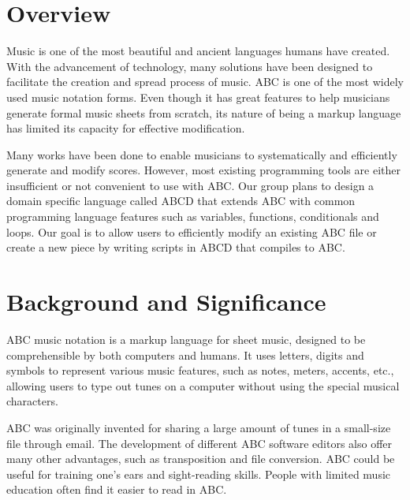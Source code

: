 \section{Overview}

Music is one of the most beautiful and ancient languages humans have created. With the advancement of technology, many solutions have been designed to facilitate the creation and spread process of music. ABC is one of the most widely used music notation forms. Even though it has great features to help musicians generate formal music sheets from scratch, its nature of being a markup language has limited its capacity for effective modification.

Many works have been done to enable musicians to systematically and efficiently generate and modify scores. However, most existing programming tools are either insufficient or not convenient to use with ABC. Our group plans to design a domain specific language called ABCD that extends ABC with common programming language features such as variables, functions, conditionals and loops. Our goal is to allow users to efficiently modify an existing ABC file or create a new piece by writing scripts in ABCD that compiles to ABC.

\section{Background and Significance}

ABC music notation is a markup language for sheet music, designed to be comprehensible by both computers and humans. It uses letters, digits and symbols to represent various music features, such as notes, meters, accents, etc., allowing users to type out tunes on a computer without using the special musical characters\cite{Walshaw11}.

ABC was originally invented for sharing a large amount of tunes in a small-size file through email\cite{Johnson17}. The development of different ABC software editors also offer many other advantages, such as transposition and file conversion. ABC could be useful for training one's ears and sight-reading skills. People with limited music education often find it easier to read in ABC\cite{Mary14}. 

